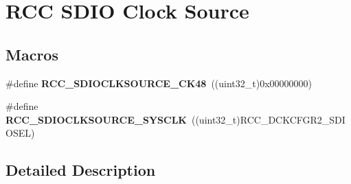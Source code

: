 \hypertarget{group___r_c_c_ex___s_d_i_o___clock___source}{}\section{R\+CC S\+D\+IO Clock Source}
\label{group___r_c_c_ex___s_d_i_o___clock___source}
\subsection*{Macros}
\begin{DoxyCompactItemize}
\item 
\#define {\bfseries R\+C\+C\+\_\+\+S\+D\+I\+O\+C\+L\+K\+S\+O\+U\+R\+C\+E\+\_\+\+C\+K48}~((uint32\+\_\+t)0x00000000)\hypertarget{group___r_c_c_ex___s_d_i_o___clock___source_ga9ef0bc577f0de24e85e10db1751ff5c7}{}\label{group___r_c_c_ex___s_d_i_o___clock___source_ga9ef0bc577f0de24e85e10db1751ff5c7}

\item 
\#define {\bfseries R\+C\+C\+\_\+\+S\+D\+I\+O\+C\+L\+K\+S\+O\+U\+R\+C\+E\+\_\+\+S\+Y\+S\+C\+LK}~((uint32\+\_\+t)R\+C\+C\+\_\+\+D\+C\+K\+C\+F\+G\+R2\+\_\+\+S\+D\+I\+O\+S\+EL)\hypertarget{group___r_c_c_ex___s_d_i_o___clock___source_ga316b8cb3376ced7509a8419e5eac28f9}{}\label{group___r_c_c_ex___s_d_i_o___clock___source_ga316b8cb3376ced7509a8419e5eac28f9}

\end{DoxyCompactItemize}


\subsection{Detailed Description}
